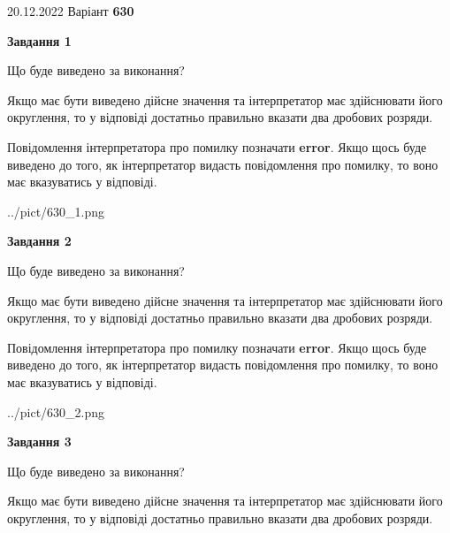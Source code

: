 \documentclass[12pt, ukrainian]{article}
\begin{document}
{20.12.2022 Варіант \No \textbf { 630 }\par}
{
\begin {Large}

{\begin {center}\textbf{Завдання 1}\end {center}}\par
Що буде виведено за виконання? \par

Якщо має бути виведено дійсне значення та інтерпретатор має здійснювати його округлення, 
то у відповіді достатньо правильно вказати два дробових розряди.

Повідомлення інтерпретатора про помилку позначати \textbf{error}.
Якщо щось буде виведено до того, як інтерпретатор видасть повідомлення про помилку, 
то воно має вказуватись у відповіді. \par

\begin{center}
	{../pict/630_1.png}
\end{center}
\newpage

{\begin {center}\textbf{Завдання 2}\end {center}}\par
Що буде виведено за виконання? \par

Якщо має бути виведено дійсне значення та інтерпретатор має здійснювати його округлення, 
то у відповіді достатньо правильно вказати два дробових розряди.

Повідомлення інтерпретатора про помилку позначати \textbf{error}.
Якщо щось буде виведено до того, як інтерпретатор видасть повідомлення про помилку, 
то воно має вказуватись у відповіді. \par

\begin{center}
	{../pict/630_2.png}
\end{center}
\newpage

{\begin {center}\textbf{Завдання 3}\end {center}}\par
Що буде виведено за виконання? \par

Якщо має бути виведено дійсне значення та інтерпретатор має здійснювати його округлення, 
то у відповіді достатньо правильно вказати два дробових розряди.


\end{Large}}
\end{document}
